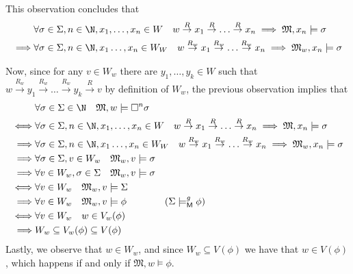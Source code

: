 \documentclass[a4paper, 12pt]{report}
\begin{document}
{{\begin{equation*}
            \end{equation*}
            This observation concludes that
            \begin{equation*}
                \begin{split}
                    & \forall \sigma \in \Sigma, n \in \N, x_1, \ldots, x_n \in W \quad w \stackrel{R}{\to} x_1 \stackrel{R}{\to} \ldots \stackrel{R}{\to} x_n \implies \mathfrak M, x_n \models \sigma \\
                    \implies & \forall \sigma \in \Sigma, n \in \N, x_1 \ldots, x_n \in W_W \quad w \stackrel{R_w}{\to} x_1 \stackrel{R_w}{\to} \ldots \stackrel{R_w}{\to} x_n \implies \mathfrak M_w, x_n \models \sigma \\
                \end{split}
            \end{equation*}

            Now, since for any $v \in W_w$ there are $y_1, \ldots, y_k \in W$ such that $w \stackrel{R_w}{\to} y_1 \stackrel{R_w}{\to} \ldots \stackrel{R_w}{\to} y_k \stackrel{R}{\to} v$ by definition of $W_w$, the previous observation implies that
            \begin{equation*}
                \begin{alignedat}{2}
                    & \forall \sigma \in \Sigma \in \N \quad \mathfrak M, w \models \Box^n \sigma && \\
                    \iff & \forall \sigma \in \Sigma, n \in \N, x_1, \ldots, x_n \in W \quad w \stackrel{R}{\to} x_1 \stackrel{R}{\to} \ldots \stackrel{R}{\to} x_n \implies \mathfrak M, x_n \models \sigma && \\
                    \implies & \forall \sigma \in \Sigma, n \in \N, x_1 \ldots, x_n \in W_W \quad w \stackrel{R_w}{\to} x_1 \stackrel{R_w}{\to} \ldots \stackrel{R_w}{\to} x_n \implies \mathfrak M_w, x_n \models \sigma && \\
                    \implies & \forall \sigma \in \Sigma, v \in W_w \quad \mathfrak M_w, v \models \sigma && \\
                    \implies & \forall v \in W_w, \sigma \in \Sigma \quad \mathfrak M_w, v \models \sigma && \\
                    \iff & \forall v \in W_w \quad \mathfrak M_w, v \models \Sigma && \\
                    \implies & \forall v \in W_w \quad \mathfrak M_w, v \models \phi \quad \quad \quad \quad (\Sigma \models_{\textsf M}^g \phi) && \\
                    \iff & \forall v \in W_w \quad w \in V_w(\phi) && \\
                    \implies & W_w \subseteq V_w(\phi) \subseteq V(\phi) && \\
                \end{alignedat}
            \end{equation*}
            Lastly, we observe that $w \in W_w$, and since $W_w \subseteq V(\phi)$ we have that $w \in V(\phi)$, which happens if and only if $\mathfrak M, w \models \phi$.

}}
\end{document}

